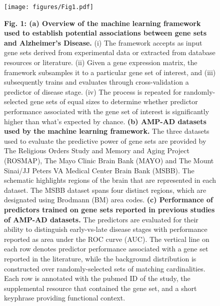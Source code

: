 \documentclass{article}
\begin{document}

\begin{landscape}
  \begin{figure}
    \begin{center}
      \texttt{[image: figures/Fig1.pdf]}
    \end{center}
    \caption*{\textbf{Fig. 1: (a) Overview of the machine learning framework used to establish potential associations between gene sets and Alzheimer’s Disease.} (i) The framework accepts as input gene sets derived from experimental data or extracted from database resources or literature. (ii) Given a gene expression matrix, the framework subsamples it to a particular gene set of interest, and (iii) subsequently trains and evaluates through cross-validation a predictor of disease stage. (iv) The process is repeated for randomly-selected gene sets of equal sizes to determine whether predictor performance associated with the gene set of interest is significantly higher than what’s expected by chance. \textbf{(b) AMP-AD datasets used by the machine learning framework.} The three datasets used to evaluate the predictive power of gene sets are provided by The Religious Orders Study and Memory and Aging Project (ROSMAP), The Mayo Clinic Brain Bank (MAYO) and The Mount Sinai/JJ Peters VA Medical Center Brain Bank (MSBB). The schematic highlights regions of the brain that are represented in each dataset. The MSBB dataset spans four distinct regions, which are designated using Brodmann (BM) area codes. \textbf{(c) Performance of predictors trained on gene sets reported in previous studies of AMP-AD datasets.} The predictors are evaluated for their ability to distinguish early-vs-late disease stages with performance reported as area under the ROC curve (AUC). The vertical line on each row denotes predictor performance associated with a gene set reported in the literature, while the background distribution is constructed over randomly-selected sets of matching cardinalities. Each row is annotated with the pubmed ID of the study, the supplemental resource that contained the gene set, and a short keyphrase providing functional context.}
  \end{figure}
\end{landscape}

\newpage

\end{document}
